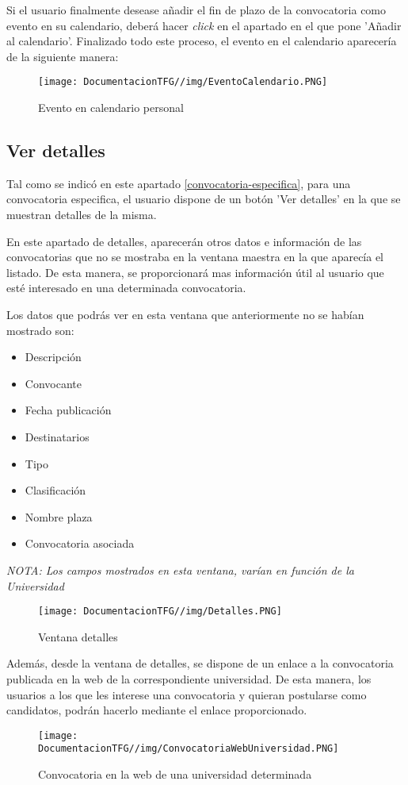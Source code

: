 Si el usuario finalmente desease añadir el fin de plazo de la convocatoria como evento en su calendario, deberá hacer \textit{click} en el apartado en el que pone 'Añadir al calendario'. Finalizado todo este proceso, el evento en el calendario aparecería de la siguiente manera:

\begin{figure}[H]
    \centering
    \texttt{[image: DocumentacionTFG//img/EventoCalendario.PNG]}
    \caption{Evento en calendario personal}
    \label{fig:evento-calendario}
\end{figure}

\subsection{Ver detalles}
Tal como se indicó en este apartado \ref{convocatoria-especifica}, para una convocatoria especifica, el usuario dispone de un botón 'Ver detalles' en la que se muestran detalles de la misma.

En este apartado de detalles, aparecerán otros datos e información de las convocatorias que no se mostraba en la ventana maestra en la que aparecía el listado. De esta manera, se proporcionará mas información útil al usuario que esté interesado en una determinada convocatoria.

Los datos que podrás ver en esta ventana que anteriormente no se habían mostrado son:
\begin{itemize}
\item Descripción
\item Convocante
\item Fecha publicación
\item Destinatarios
\item Tipo
\item Clasificación
\item Nombre plaza
\item Convocatoria asociada
\end{itemize}

\textit{NOTA: Los campos mostrados en esta ventana, varían en función de la Universidad}

\begin{figure}[H]
    \centering
    \texttt{[image: DocumentacionTFG//img/Detalles.PNG]}
    \caption{Ventana detalles}
    \label{fig:ventana-detalles}
\end{figure}

Además, desde la ventana de detalles, se dispone de un enlace a la convocatoria publicada en la web de la correspondiente universidad. De esta manera, los usuarios a los que les interese una convocatoria y quieran postularse como candidatos, podrán hacerlo mediante el enlace proporcionado.

\begin{figure}[H]
    \centering
    \texttt{[image: DocumentacionTFG//img/ConvocatoriaWebUniversidad.PNG]}
    \caption{Convocatoria en la web de una universidad determinada}
    \label{fig:convocatoria-web-universidad}
\end{figure}